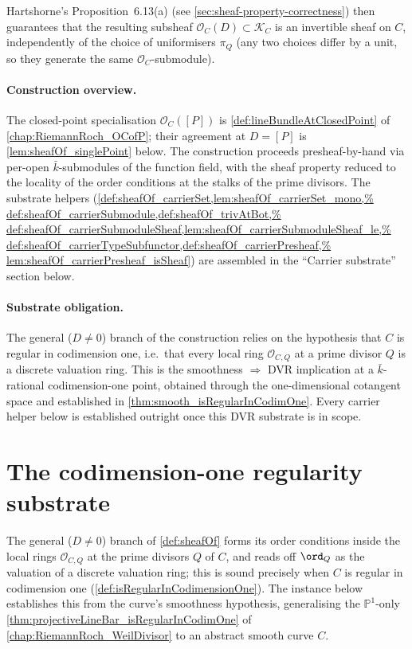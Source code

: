 \begin{definition}
  Hartshorne's Proposition~6.13(a) (see
  \cref{sec:sheaf-property-correctness})
  then guarantees that the resulting subsheaf $\mathcal O_C(D) \subset
  \mathcal K_C$ is an invertible sheaf on $C$, independently of the
  choice of uniformisers \(\pi_Q\) (any two choices differ by a unit, so
  they generate the same \(\mathcal O_C\)-submodule).

  \paragraph{Construction overview.}
  The closed-point specialisation \(\mathcal O_C([P])\) is
  \cref{def:lineBundleAtClosedPoint} of \cref{chap:RiemannRoch_OCofP};
  their agreement at \(D = [P]\) is \cref{lem:sheafOf_singlePoint} below.
  The construction proceeds presheaf-by-hand via per-open
  \(\bar k\)-submodules of the function field, with the sheaf property
  reduced to the locality of the order conditions at the stalks of the
  prime divisors. The substrate helpers
  (\cref{def:sheafOf_carrierSet,lem:sheafOf_carrierSet_mono,%
  def:sheafOf_carrierSubmodule,def:sheafOf_trivAtBot,%
  def:sheafOf_carrierSubmoduleSheaf,lem:sheafOf_carrierSubmoduleSheaf_le,%
  def:sheafOf_carrierTypeSubfunctor,def:sheafOf_carrierPresheaf,%
  lem:sheafOf_carrierPresheaf_isSheaf}) are assembled in the
  ``Carrier substrate'' section below.

  \paragraph{Substrate obligation.} The general (\(D \neq 0\)) branch of
  the construction relies on the hypothesis that \(C\) is regular in
  codimension one, i.e.\ that every local ring \(\mathcal O_{C, Q}\) at a
  prime divisor \(Q\) is a discrete valuation ring. This is the smoothness
  \(\Rightarrow\) DVR implication at a \(\bar k\)-rational codimension-one
  point, obtained through the one-dimensional cotangent space and
  established in \cref{thm:smooth_isRegularInCodimOne}.
  Every carrier helper below is established outright once this DVR
  substrate is in scope.
\end{definition}

\section{The codimension-one regularity substrate}

The general (\(D \neq 0\)) branch of \cref{def:sheafOf} forms its order
conditions inside the local rings \(\mathcal O_{C, Q}\) at the prime
divisors \(Q\) of \(C\), and reads off \(\ord_Q\) as the valuation of a
discrete valuation ring; this is sound precisely when \(C\) is regular in
codimension one (\cref{def:isRegularInCodimensionOne}). The instance below
establishes this from the curve's smoothness hypothesis,
generalising the \(\mathbb P^1\)-only
\cref{thm:projectiveLineBar_isRegularInCodimOne} of
\cref{chap:RiemannRoch_WeilDivisor} to an abstract smooth curve \(C\).

